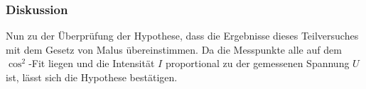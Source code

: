 		\subsubsection*{Diskussion}
			
			Nun zu der Überprüfung der Hypothese, dass die Ergebnisse dieses Teilversuches mit dem Gesetz von Malus übereinstimmen.
			Da die Messpunkte alle auf dem $\cos^2$-Fit liegen und die Intensität $I$ proportional zu der gemessenen Spannung $U$ ist, lässt sich die Hypothese bestätigen.
